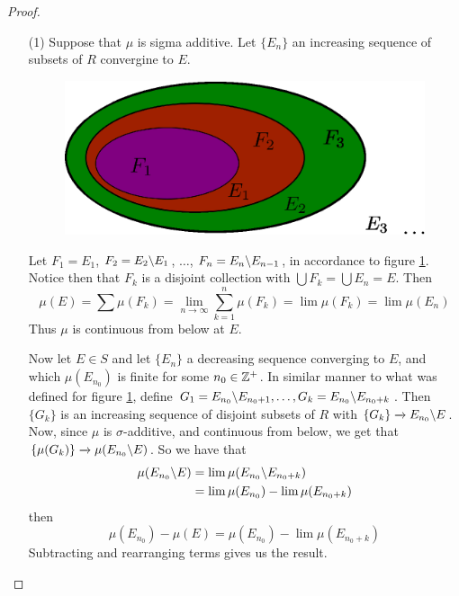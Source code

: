 \begin{proof}
    \begin{enumerate}
        \item[(1)] Suppose that $\mu$ is sigma additive. Let  $\{E_n\}$ an
            increasing sequence of subsets of $R$ convergine to $E$.
            \begin{figure}[h]
                \centering
                \includegraphics[scale=1]{Figures/increasing_cover.eps}
                \caption{}
                \label{figure_2}
            \end{figure}
            Let $F_1=E_1$, $F_2=E_2\backslash E_1$, $\dots$,
            $F_n=E_n\backslash E_{n-1}$, in accordance to figure \ref{figure_2}.
            Notice then that ${F_k}$ is a disjoint collection with
            $\bigcup{F_k}=\bigcup{E_n}=E$.
            Then
            \begin{equation*}
                \mu(E)=\sum{\mu(F_k)}=\lim_{n \xrightarrow{}
                \infty}{\sum_{k=1}^n{\mu(F_k)}}=\lim{\mu(F_k)}=\lim{\mu(E_n)}
            \end{equation*}
            Thus $\mu$ is continuous from below at  $E$.

            Now let $E \in S$ and let $\{E_n\}$ a decreasing sequence converging
            to $E$, and which  $\mu(E_{n_0})$ is finite for some $n_0 \in \mathbb{Z}^+$.
            In similar manner to what was defined for figure \ref{figure_2},
            define $G_1=E_{n_0}\backslash E_{n_0+1}, \dots,
            G_k=E_{n_0}\backslash E_{n_0+k}$. Then $\{G_k\}$ is an increasing
            sequence of disjoint subsets of $R$ with  $\{G_k\} \xrightarrow{}
            E_{n_0}\backslash E$. Now, since $\mu$ is  $\sigma$-additive, and
            continuous from below, we get that  $\{\mu(G_k)\} \xrightarrow{}
            \mu(E_{n_0}\backslash E)$. So we have that
            \begin{align*}
                \mu(E_{n_0}\backslash E) &=  \lim{\mu(E_{n_0}\backslash E_{n_0+k})} \\
                                    &=  \lim{\mu(E_{n_0})}-\lim{\mu(E_{n_0+k})} \\
            \end{align*}
            then
            \begin{equation*}
                \mu(E_{n_0})-\mu(E)=\mu(E_{n_0})-\lim{\mu(E_{n_0+k})}
            \end{equation*}
            Subtracting and rearranging terms gives us the result.


\end{enumerate}
\end{proof}
